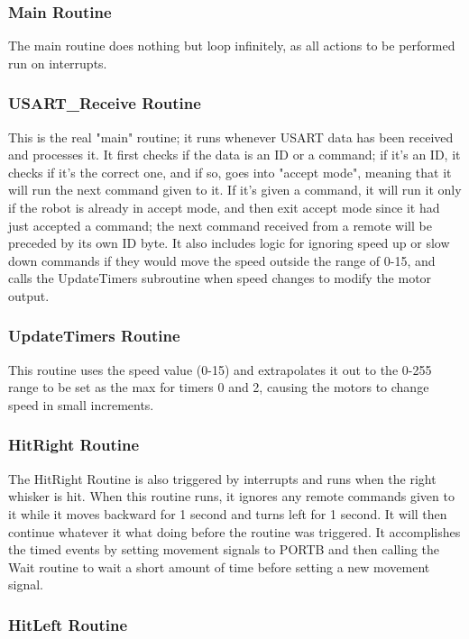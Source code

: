 \documentclass[12pt,letterpaper]{article}
\begin{document}
\subsubsection{Main Routine}

The main routine does nothing but loop infinitely, as all actions to be
performed run on interrupts.

\subsubsection{USART\_Receive Routine}

This is the real "main" routine; it runs whenever USART data has been received
and processes it.  It first checks if the data is an ID or a command; if it's
an ID, it checks if it's the correct one, and if so, goes into "accept mode",
meaning that it will run the next command given to it.  If it's given a
command, it will run it only if the robot is already in accept mode, and then
exit accept mode since it had just accepted a command; the next command
received from a remote will be preceded by its own ID byte.  It also includes
logic for ignoring speed up or slow down commands if they would move the speed
outside the range of 0-15, and calls the UpdateTimers subroutine when speed
changes to modify the motor output.

\subsubsection{UpdateTimers Routine}

This routine uses the speed value (0-15) and extrapolates it out to the 0-255
range to be set as the max for timers 0 and 2, causing the motors to change
speed in small increments.

\subsubsection{HitRight Routine}

The HitRight Routine is also triggered by interrupts and runs when the right
whisker is hit.  When this routine runs, it ignores any remote commands given
to it while it moves backward for 1 second and turns left for 1 second.  It
will then continue whatever it what doing before the routine was triggered.  It
accomplishes the timed events by setting movement signals to PORTB and then
calling the Wait routine to wait a short amount of time before setting a new
movement signal.

\subsubsection{HitLeft Routine}
\end{document}
